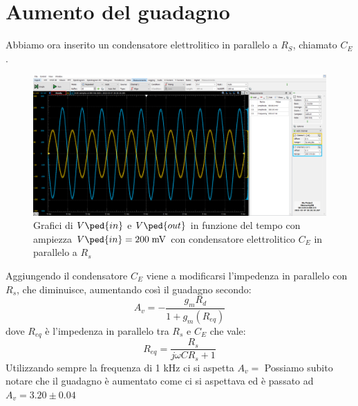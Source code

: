 \documentclass[10pt, a4paper, italian]{article}
\begin{document}
\section{Aumento del guadagno}
Abbiamo ora inserito un condensatore elettrolitico in parallelo a $R_S$, chiamato $C_E$.
\begin{figure}[htbp]
    \centering
	\includegraphics[scale=0.4]{amp.200.cap}
    \caption{Grafici di $V\ped{in}$ e $V\ped{out}$ in funzione del tempo con ampiezza $V\ped{in}=200 \; \si{m\V}$ con condensatore elettrolitico $C_E$ in parallelo a $R_s$}
\end{figure}
Aggiungendo il condensatore $C_E$ viene a modificarsi l'impedenza in parallelo con $R_s$, che diminuisce, aumentando così il guadagno secondo:
\begin{equation}
A_v = -\frac{g_m R_d}{1+g_m (R_{eq})}
\end{equation}
dove $R_{eq}$ è l'impedenza in parallelo tra $R_s$ e $C_E$ che vale:
\begin{equation}
R_{eq} = \frac{R_s}{j\omega C R_s +1}
\end{equation}
Utilizzando sempre la frequenza di 1 kHz ci si aspetta $A_v =$
Possiamo subito notare che il guadagno è aumentato come ci si aspettava ed è passato ad $A_v = 3.20 \pm 0.04$

\end{document}
